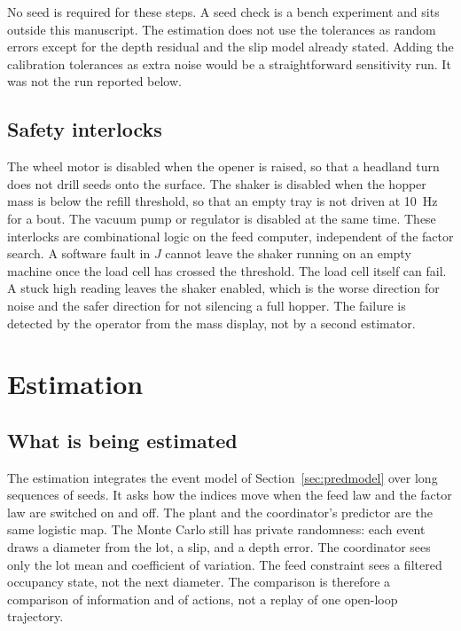 No seed is required for these steps. A seed check is a bench experiment and sits outside this manuscript. The estimation does not use the tolerances as random errors except for the depth residual and the slip model already stated. Adding the calibration tolerances as extra noise would be a straightforward sensitivity run. It was not the run reported below.

\subsection{Safety interlocks}

The wheel motor is disabled when the opener is raised, so that a headland turn does not drill seeds onto the surface. The shaker is disabled when the hopper mass is below the refill threshold, so that an empty tray is not driven at 10~Hz for a bout. The vacuum pump or regulator is disabled at the same time. These interlocks are combinational logic on the feed computer, independent of the factor search. A software fault in $J$ cannot leave the shaker running on an empty machine once the load cell has crossed the threshold. The load cell itself can fail. A stuck high reading leaves the shaker enabled, which is the worse direction for noise and the safer direction for not silencing a full hopper. The failure is detected by the operator from the mass display, not by a second estimator.

\section{Estimation}
\label{sec:estimation}

\subsection{What is being estimated}

The estimation integrates the event model of Section~\ref{sec:predmodel} over long sequences of seeds. It asks how the indices move when the feed law and the factor law are switched on and off. The plant and the coordinator's predictor are the same logistic map. The Monte Carlo still has private randomness: each event draws a diameter from the lot, a slip, and a depth error. The coordinator sees only the lot mean and coefficient of variation. The feed constraint sees a filtered occupancy state, not the next diameter. The comparison is therefore a comparison of information and of actions, not a replay of one open-loop trajectory.

